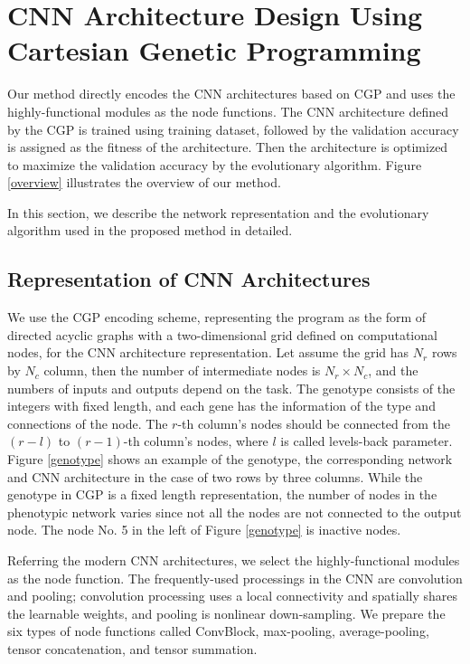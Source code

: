 \section{CNN Architecture Design Using Cartesian Genetic Programming}
Our method directly encodes the CNN architectures based on CGP  and uses the highly-functional modules as the node functions.
The CNN architecture defined by the CGP is trained using training dataset, followed by the validation accuracy is assigned as the fitness of the architecture. Then the architecture is optimized to maximize the validation accuracy by the evolutionary algorithm.
Figure \ref{overview} illustrates the overview of our method.

In this section, we describe the network representation and the evolutionary algorithm used in the proposed method in detailed.

\subsection{Representation of CNN Architectures}
We use the CGP encoding scheme, representing the program as the form of directed acyclic graphs with a two-dimensional grid defined on computational nodes, for the CNN architecture representation. Let assume the grid has $N_r$ rows by $N_c$ column, then the number of intermediate nodes is $N_r \times N_c$, and the numbers of inputs and outputs depend on the task. The genotype consists of the integers with fixed length, and each gene has the information of the type and connections of the node. The $r$-th column's nodes should be connected from the $(r-l)$ to $(r-1)$-th column's nodes, where $l$ is called levels-back parameter. Figure \ref{genotype} shows an example of the genotype, the corresponding network and CNN architecture in the case of two rows by three columns. While the genotype in CGP is a fixed length representation, the number of nodes in the phenotypic network varies since not all the nodes are not connected to the output node. The node No. 5 in the left of Figure \ref{genotype} is inactive nodes.

Referring the modern CNN architectures, we select the highly-functional modules as the node function.
The frequently-used processings in the CNN are convolution and pooling; convolution processing uses a local connectivity and spatially shares the learnable weights, and pooling is nonlinear down-sampling.
We prepare the six types of node functions called ConvBlock,  max-pooling, average-pooling, tensor concatenation, and tensor summation.

